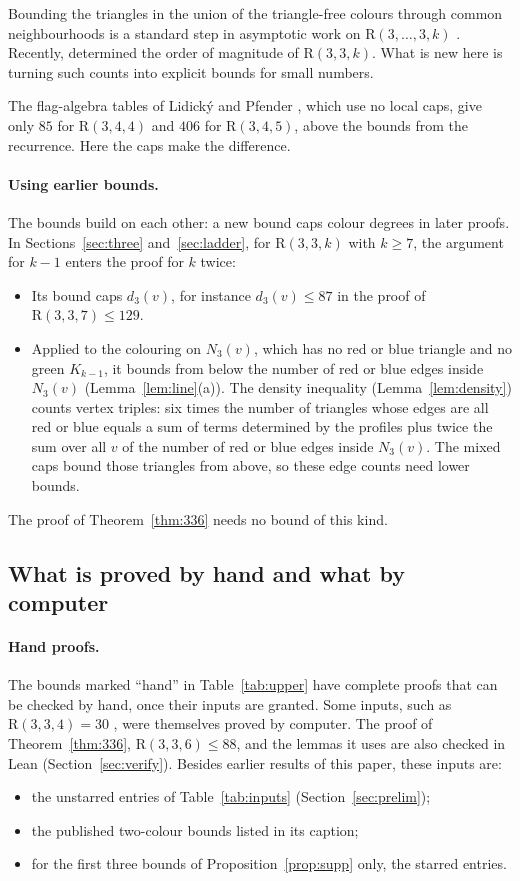 \documentclass[11pt]{article}
\theoremstyle{spacedplain}
\theoremstyle{spaceddef}
\theoremstyle{spacedremark}
\newcommand{\R}{\mathrm{R}}
\begin{document}
Bounding the triangles in the union of the triangle-free colours through common neighbourhoods is a standard step in asymptotic work on $\R(3,\dots,3,k)$ \cite{AR05,HW20,ACM26}.
Recently, \cite{ACM26} determined the order of magnitude of $\R(3,3,k)$.
What is new here is turning such counts into explicit bounds for small numbers.

The flag-algebra tables of Lidick\'y and Pfender \cite{LP21}, which use no local caps, give only $85$ for $\R(3,4,4)$ and $406$ for $\R(3,4,5)$, above the bounds from the recurrence.
Here the caps make the difference.

\paragraph{Using earlier bounds.}
The bounds build on each other: a new bound caps colour degrees in later proofs.
In Sections~\ref{sec:three} and~\ref{sec:ladder}, for $\R(3,3,k)$ with $k\ge 7$, the argument for $k-1$ enters the proof for $k$ twice:
\begin{itemize}
\item Its bound caps $d_3(v)$, for instance $d_3(v)\le 87$ in the proof of $\R(3,3,7)\le 129$.
\item Applied to the colouring on $N_3(v)$, which has no red or blue triangle and no green $K_{k-1}$, it bounds from below the number of red or blue edges inside $N_3(v)$ (Lemma~\ref{lem:line}(a)).
The density inequality (Lemma~\ref{lem:density}) counts vertex triples: six times the number of triangles whose edges are all red or blue equals a sum of terms determined by the profiles plus twice the sum over all $v$ of the number of red or blue edges inside $N_3(v)$.
The mixed caps bound those triangles from above, so these edge counts need lower bounds.
\end{itemize}
The proof of Theorem~\ref{thm:336} needs no bound of this kind.

\subsection{What is proved by hand and what by computer}

\paragraph{Hand proofs.}
The bounds marked ``hand'' in Table~\ref{tab:upper} have complete proofs that can be checked by hand, once their inputs are granted.
Some inputs, such as $\R(3,3,4)=30$ \cite{CFIM16}, were themselves proved by computer.
The proof of Theorem~\ref{thm:336}, $\R(3,3,6)\le 88$, and the lemmas it uses are also checked in Lean (Section~\ref{sec:verify}).
Besides earlier results of this paper, these inputs are:
\begin{itemize}
\item the unstarred entries of Table~\ref{tab:inputs} (Section~\ref{sec:prelim});
\item the published two-colour bounds listed in its caption;
\item for the first three bounds of Proposition~\ref{prop:supp} only, the starred entries.
\end{itemize}
\end{document}
